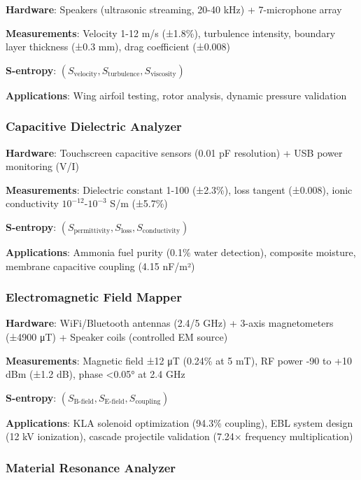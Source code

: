 \documentclass[12pt,a4paper]{article}
\begin{document}
\textbf{Hardware}: Speakers (ultrasonic streaming, 20-40 kHz) + 7-microphone array

\textbf{Measurements}: Velocity 1-12 m/s (±1.8\%), turbulence intensity, boundary layer thickness (±0.3 mm), drag coefficient (±0.008)

\textbf{S-entropy}: $(S_{\text{velocity}}, S_{\text{turbulence}}, S_{\text{viscosity}})$

\textbf{Applications}: Wing airfoil testing, rotor analysis, dynamic pressure validation

\subsubsection{Capacitive Dielectric Analyzer \cite{sachikonye2024capacitive_dielectric}}

\textbf{Hardware}: Touchscreen capacitive sensors (0.01 pF resolution) + USB power monitoring (V/I)

\textbf{Measurements}: Dielectric constant 1-100 (±2.3\%), loss tangent (±0.008), ionic conductivity $10^{-12}$-$10^{-3}$ S/m (±5.7\%)

\textbf{S-entropy}: $(S_{\text{permittivity}}, S_{\text{loss}}, S_{\text{conductivity}})$

\textbf{Applications}: Ammonia fuel purity (0.1\% water detection), composite moisture, membrane capacitive coupling (4.15 nF/m²)

\subsubsection{Electromagnetic Field Mapper \cite{sachikonye2024em_field_mapper}}

\textbf{Hardware}: WiFi/Bluetooth antennas (2.4/5 GHz) + 3-axis magnetometers (±4900 μT) + Speaker coils (controlled EM source)

\textbf{Measurements}: Magnetic field ±12 μT (0.24\% at 5 mT), RF power -90 to +10 dBm (±1.2 dB), phase <0.05° at 2.4 GHz

\textbf{S-entropy}: $(S_{\text{B-field}}, S_{\text{E-field}}, S_{\text{coupling}})$

\textbf{Applications}: KLA solenoid optimization (94.3\% coupling), EBL system design (12 kV ionization), cascade projectile validation (7.24× frequency multiplication)

\subsubsection{Material Resonance Analyzer \cite{sachikonye2024material_resonance}}
\end{document}
